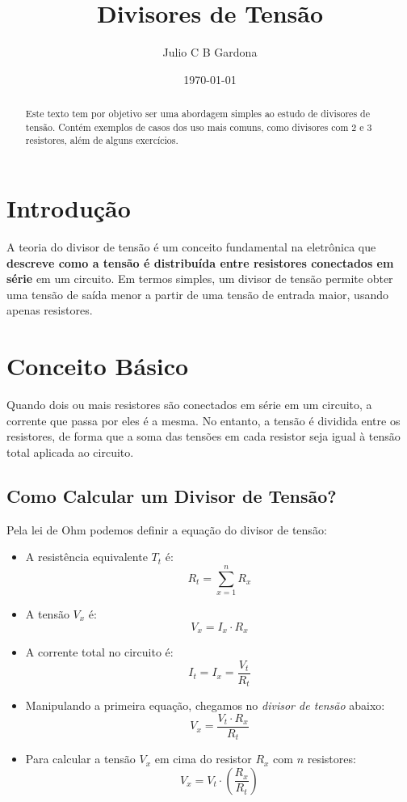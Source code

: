 \documentclass[]{article}
\title{Divisores de Tensão}
\author{Julio C B Gardona}
\date{\today}
\begin{document}
\maketitle
\clearpage
\tableofcontents
\clearpage

\begin{abstract}
	
Este texto tem por objetivo ser uma abordagem simples ao estudo de divisores de tensão. Contém exemplos de casos dos uso mais comuns, como divisores com 2 e 3 resistores, além de alguns exercícios.
\end{abstract}

\section{Introdução}
A teoria do divisor de tensão é um conceito fundamental na eletrônica que \textbf{descreve como a tensão é distribuída entre resistores conectados em série} em um circuito. Em termos simples, um divisor de tensão permite obter uma tensão de saída menor a partir de uma tensão de entrada maior, usando apenas resistores.

\section{Conceito Básico}
Quando dois ou mais resistores são conectados em série em um circuito, a corrente que passa por eles é a mesma. No entanto, a tensão é dividida entre os resistores, de forma que a soma das tensões em cada resistor seja igual à tensão total aplicada ao circuito.

\subsection{Como Calcular um Divisor de Tensão?}

Pela lei de Ohm podemos definir a equação do divisor de tensão:

\begin{itemize}
	\item A resistência equivalente $T_t$ é:
	$$
	R_t = \sum_{x=1}^n R_x
	$$
	
	\item A tensão $V_x$ é:
	$$
	V_x = I_x \cdot R_x
	$$ 
	
	\item A corrente total no circuito é:
	$$
	I_t = I_x = \frac{V_t}{R_t}
	$$
	
	\item Manipulando a primeira equação, chegamos no \textit{divisor de tensão} abaixo:
	$$
	V_x = \frac{V_t \cdot R_x}{R_t}
	$$
	
	\item Para calcular a tensão $V_x$ em cima do resistor $R_x$ com $n$ resistores:
	$$
	V_x = V_t \cdot \left( \frac{R_x}{R_t} \right)
	$$
\end{itemize}
\end{document}

